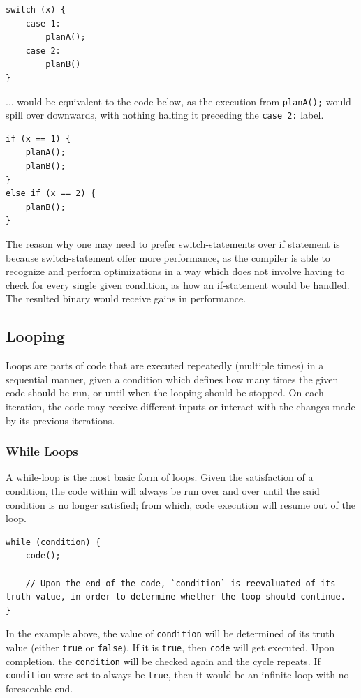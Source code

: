 \documentclass[12pt]{article}
\begin{document}
\begin{verbatim}
switch (x) {
    case 1:
        planA();
    case 2:
        planB()
}
\end{verbatim}

... would be equivalent to the code below, as the execution from \linebreak \texttt{planA();} would spill over downwards, with nothing halting it preceding the \texttt{case 2:} label.

\begin{verbatim}
if (x == 1) {
    planA();
    planB();
}
else if (x == 2) {
    planB();
}
\end{verbatim}

The reason why one may need to prefer switch-statements over if statement is because switch-statement offer more performance, as the compiler is able to recognize and perform optimizations in a way which does not involve having to check for every single given condition, as how an if-statement would be handled. The resulted binary would receive gains in performance.

\subsection{Looping}
Loops are parts of code that are executed repeatedly (multiple times) in a sequential manner, given a condition which defines how many times the given code should be run, or until when the looping should be stopped. On each iteration, the code may receive different inputs or interact with the changes made by its previous iterations.

\subsubsection{While Loops}
A while-loop is the most basic form of loops. Given the satisfaction of a condition, the code within will always be run over and over until the said condition is no longer satisfied; from which, code execution will resume out of the loop.

\begin{verbatim}
while (condition) {
    code();

    // Upon the end of the code, `condition` is reevaluated of its truth value, in order to determine whether the loop should continue.
}
\end{verbatim}

In the example above, the value of \texttt{condition} will be determined of its truth value (either \texttt{true} or \texttt{false}). If it is \texttt{true}, then \texttt{code} will get executed. Upon completion, the \texttt{condition} will be checked again and the cycle repeats. If \texttt{condition} were set to always be \texttt{true}, then it would be an infinite loop with no foreseeable end.
\end{document}
